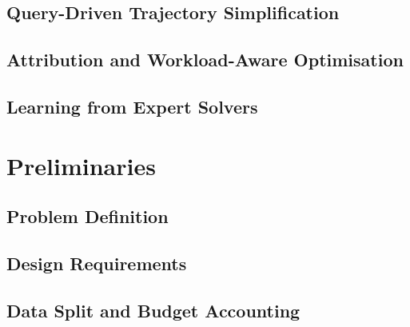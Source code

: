 \documentclass[conference]{IEEEtran}
\begin{document}
\subsection{Query-Driven Trajectory Simplification}
\label{sec:related-qdts}

\subsection{Attribution and Workload-Aware Optimisation}
\label{sec:related-attribution}

\subsection{Learning from Expert Solvers}
\label{sec:related-imitation}

\section{Preliminaries}
\label{sec:prelim}
\label{sec:framework}

\subsection{Problem Definition}
\label{sec:problem}

\subsection{Design Requirements}
\label{sec:requirements}

\subsection{Data Split and Budget Accounting}
\label{sec:split}
\end{document}
